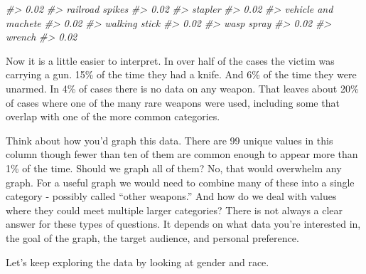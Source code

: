 \documentclass[
  12pt,
  openany]{book}
\newenvironment{Shaded}{\begin{snugshade}}{\end{snugshade}}
\newcommand{\CommentTok}[1]{\textcolor[rgb]{0.37,0.37,0.37}{\textit{#1}}}
\newcommand{\DecValTok}[1]{\textcolor[rgb]{0.06,0.06,0.06}{#1}}
\newcommand{\FunctionTok}[1]{\textcolor[rgb]{0,0,0}{#1}}
\newcommand{\NormalTok}[1]{#1}
\newcommand{\SpecialCharTok}[1]{\textcolor[rgb]{0,0,0}{#1}}
\begin{document}
\begin{Shaded}
\begin{Highlighting}[]
\CommentTok{\#\textgreater{}                             0.02 }
\CommentTok{\#\textgreater{}                  railroad spikes }
\CommentTok{\#\textgreater{}                             0.02 }
\CommentTok{\#\textgreater{}                          stapler }
\CommentTok{\#\textgreater{}                             0.02 }
\CommentTok{\#\textgreater{}              vehicle and machete }
\CommentTok{\#\textgreater{}                             0.02 }
\CommentTok{\#\textgreater{}                    walking stick }
\CommentTok{\#\textgreater{}                             0.02 }
\CommentTok{\#\textgreater{}                       wasp spray }
\CommentTok{\#\textgreater{}                             0.02 }
\CommentTok{\#\textgreater{}                           wrench }
\CommentTok{\#\textgreater{}                             0.02}
\end{Highlighting}
\end{Shaded}

Now it is a little easier to interpret. In over half of the cases the victim was carrying a gun. 15\% of the time they had a knife. And 6\% of the time they were unarmed. In 4\% of cases there is no data on any weapon. That leaves about 20\% of cases where one of the many rare weapons were used, including some that overlap with one of the more common categories.

Think about how you'd graph this data. There are 99 unique values in this column though fewer than ten of them are common enough to appear more than 1\% of the time. Should we graph all of them? No, that would overwhelm any graph. For a useful graph we would need to combine many of these into a single category - possibly called ``other weapons.'' And how do we deal with values where they could meet multiple larger categories? There is not always a clear answer for these types of questions. It depends on what data you're interested in, the goal of the graph, the target audience, and personal preference.

Let's keep exploring the data by looking at gender and race.

\begin{Shaded}
\end{Shaded}
\end{document}
